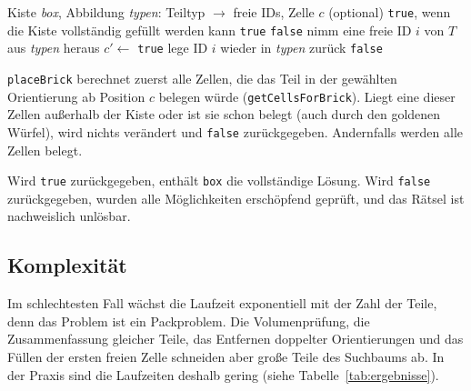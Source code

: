 \documentclass[11pt,a4paper,parskip=half]{scrartcl}
\newcommand{\code}[1]{\texttt{#1}}
\begin{document}
\begin{algorithm}[H]
\caption{\code{solvePuzzle} (vereinfacht)}
\begin{algorithmic}[1]
\Require Kiste \textit{box}, Abbildung \textit{typen}: Teiltyp $\to$ freie IDs, Zelle $c$ (optional)
\Ensure \code{true}, wenn die Kiste vollständig gefüllt werden kann
   \Return \code{true} 
  \EndIf
   \Return \code{false} 
  \EndIf
    \State nimm eine freie ID $i$ von $T$ aus \textit{typen} heraus
       
        \State $c' \gets$ 
          \State \Return \code{true}
        \EndIf
        \State {} 
      \EndIf
    \EndFor
    \State lege ID $i$ wieder in \textit{typen} zurück
  \EndFor
  \State \Return \code{false}
\EndFunction
\end{algorithmic}
\end{algorithm}

\code{placeBrick} berechnet zuerst alle Zellen, die das Teil in der gewählten
Orientierung ab Position $c$ belegen würde (\code{getCellsForBrick}). Liegt eine
dieser Zellen außerhalb der Kiste oder ist sie schon belegt (auch durch den goldenen
Würfel), wird nichts verändert und \code{false} zurückgegeben. Andernfalls werden alle
Zellen belegt.

Wird \code{true} zurückgegeben, enthält \code{box} die vollständige Lösung. Wird
\code{false} zurückgegeben, wurden alle Möglichkeiten erschöpfend geprüft, und das
Rätsel ist nachweislich unlösbar.

\subsection{Komplexität}

Im schlechtesten Fall wächst die Laufzeit exponentiell mit der Zahl der Teile, denn
das Problem ist ein Packproblem. Die Volumenprüfung, die Zusammenfassung gleicher
Teile, das Entfernen doppelter Orientierungen und das Füllen der ersten freien Zelle
schneiden aber große Teile des Suchbaums ab. In der Praxis sind die Laufzeiten
deshalb gering (siehe Tabelle~\ref{tab:ergebnisse}).
\end{document}
